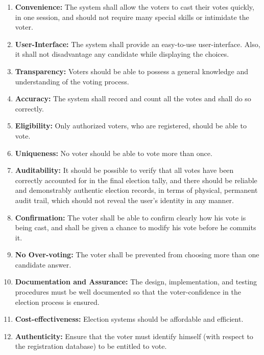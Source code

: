 \begin{enumerate}
	\item \textbf{Convenience:} The system shall allow the voters to cast their votes quickly, in one session, and should not require many special skills or intimidate the voter.
	
	\item \textbf{User-Interface:} The system shall provide an easy-to-use user-interface. Also, it shall not disadvantage any candidate while displaying the choices.
	
	\item \textbf{Transparency:} Voters should be able to possess a general knowledge and understanding of the voting process.
	
	\item \textbf{Accuracy:} The system shall record and count all the votes and shall do so correctly.
	
	\item \textbf{Eligibility:} Only authorized voters, who are registered, should be able to vote.
	
	\item \textbf{Uniqueness:} No voter should be able to vote more than once.
	
	\item \textbf{Auditability:} It should be possible to verify that all votes have been correctly accounted for in the final election tally, and there should be reliable and demonstrably authentic election records, in terms of physical, permanent audit trail, which should not reveal the user’s identity in any manner.
	
	\item \textbf{Confirmation:} The voter shall be able to confirm clearly how his vote is being cast, and shall be given a chance to modify his vote before he commits it.
	
	\item \textbf{No Over-voting:} The voter shall be prevented from choosing more than one candidate answer.
	
	\item \textbf{Documentation and Assurance:} The design, implementation, and testing procedures must be well documented so that the voter-confidence in the election process is ensured.
	
	\item \textbf{Cost-effectiveness:} Election systems should be affordable and efficient.
	
	\item \textbf{Authenticity:} Ensure that the voter must identify himself (with respect to the registration database) to be entitled to vote.
	

\end{enumerate}
